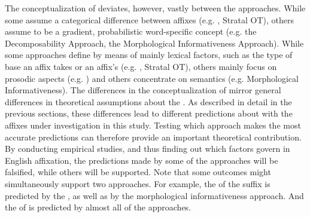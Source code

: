  The conceptualization of  deviates, however, vastly between the approaches. While some assume a categorical difference between affixes (e.g. , Stratal OT), others assume  to be a gradient, probabilistic word-specific concept (e.g. the Decomposability Approach, the Morphological Informativeness Approach). 
 While some approaches define  by means of mainly lexical factors, such as the type of base an affix takes or an affix's  (e.g. , Stratal OT), others mainly focus on prosodic aspects (e.g. ) and others concentrate on semantics (e.g. Morphological Informativeness).  The differences in the conceptualization of  mirror general differences in theoretical assumptions about the . As described in detail in the previous sections, these differences lead to different predictions about  with the affixes under investigation in this study.
 Testing which approach makes the most accurate predictions can therefore provide an important theoretical contribution. 
 By conducting empirical studies, and thus finding out which factors govern  in English affixation, the predictions made by some of the approaches will be falsified, while others will be supported. Note that some outcomes might simultaneously support two approaches. For example, the  of the suffix  is predicted by the , as well as by the morphological informativeness approach. And the  of  is predicted by almost all of the approaches.




